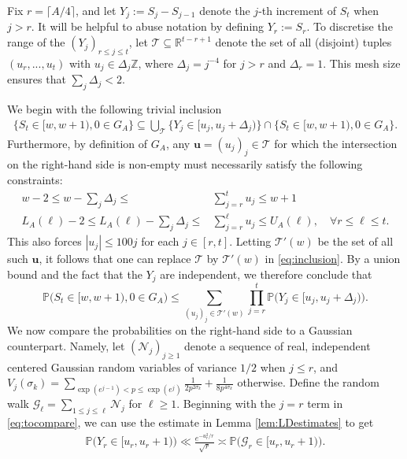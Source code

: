 \documentclass{amsart}
\theoremstyle{definition}
\theoremstyle{remark}
\numberwithin{equation}{section}
\begin{document}
Fix $r=\lceil A/4\rceil$, and let $Y_j:=S_j-S_{j-1}$ denote the $j$-th increment of $S_{t}$ when $j>r$. It will be helpful to abuse notation by defining $Y_r:=S_{r}$. To discretise the range of the $(Y_j)_{r\leq j\leq t}$, let $\mathcal{T}\subseteq \mathbb{R}^{t-r+1}$ denote the set of all (disjoint) tuples $(u_{r},...,u_{t})$ with $u_j\in \Delta_j\mathbb{Z}$, where $\Delta_j=j^{-4}$ for $j>r$ and $\Delta_r=1$. This mesh size ensures that $\sum_j\Delta_j<2$.

We begin with the following trivial inclusion
\begin{align}\label{eq:inclusion}
    \big\{ S_{t}\in [w,w+1),0\in G_A\big\} \subseteq \bigcup_{\mathcal{T}} \big\{Y_j\in[u_j, u_j+\Delta_j)\big\}\cap\big\{ S_{t}\in [w,w+1), 0\in G_A\big\}.
\end{align}
Furthermore, by definition of $G_A$, any $\mathbf{u}=(u_j)_j\in \mathcal{T}$ for which the intersection on the right-hand side is non-empty must necessarily satisfy the following constraints:
\begin{align}\label{eq:constraint1}
    w-2\leq w-\sum_j \Delta_j\leq &\sum_{j=r}^{t} u_j \leq w+1\\\label{eq:constraint2}
    L_A(\ell)-2\leq L_A(\ell)-\sum_j \Delta_j\leq&\sum_{j=r}^{\ell}u_j\leq U_A(\ell),\quad \forall r\leq \ell\leq t.
\end{align}
This also forces $|u_j|\leq 100j$ for each $j\in [r,t]$. 
Letting $\mathcal{T}'(w)$ be the set of all such $\mathbf{u}$, it follows that one can replace $\mathcal{T}$ by $\mathcal{T}'(w)$ in \eqref{eq:inclusion}. By a union bound and the fact that the  $Y_j$ are independent, we therefore conclude that
\begin{equation}\label{eq:tocompare}
    \mathbb{P}\big(S_{t}\in [w,w+1), 0\in G_A \big)\leq \sum_{(u_j)_j\in \mathcal{T}'(w)} \prod_{j=r}^{t}\mathbb{P}\big(Y_j\in [u_j,u_j+\Delta_j)\big).
\end{equation}
We now compare the probabilities on the right-hand side to a Gaussian counterpart. Namely, let $(\mathcal{N}_j)_{j\geq 1}$ denote a sequence of real, independent centered Gaussian random variables of variance $1/2$ when $j\leq r$, and $V_j(\sigma_k)=\sum_{\exp(e^{j-1})<p\leq \exp(e^j)}\frac{1}{2p^{2\sigma_k}}+\frac{1}{8p^{4\sigma_k}}$ otherwise. Define the random walk $\mathcal{G}_\ell=\sum_{1\leq j \leq \ell}\mathcal{N}_j$ for $\ell\geq 1$. Beginning with the $j=r$ term in \eqref{eq:tocompare}, we can use the estimate in Lemma \ref{lem:LDestimates} to get
\begin{align}\label{eq:first_increment}
    \mathbb{P}\big(Y_r\in [u_r,u_r+1)\big)\ll \frac{e^{-u_r^2/r}}{\sqrt{r}}\asymp\mathbb{P}\big(\mathcal{G}_r\in [u_r,u_r+1)\big).
\end{align}
\end{document}
